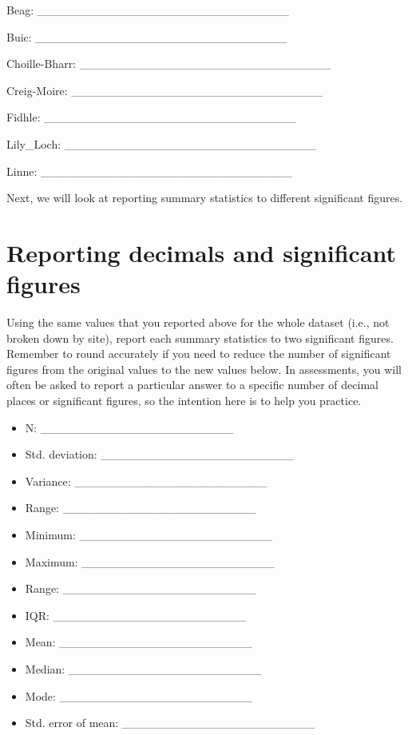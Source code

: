 \documentclass[
]{scrbook}
\providecommand{\tightlist}{%
  \setlength{\itemsep}{0pt}\setlength{\parskip}{0pt}}
\begin{document}
Beag: \_\_\_\_\_\_\_\_\_\_\_\_\_\_\_\_\_\_\_\_\_\_\_\_\_\_\_\_\_\_

Buic: \_\_\_\_\_\_\_\_\_\_\_\_\_\_\_\_\_\_\_\_\_\_\_\_\_\_\_\_\_\_

Choille-Bharr: \_\_\_\_\_\_\_\_\_\_\_\_\_\_\_\_\_\_\_\_\_\_\_\_\_\_\_\_\_\_

Creig-Moire: \_\_\_\_\_\_\_\_\_\_\_\_\_\_\_\_\_\_\_\_\_\_\_\_\_\_\_\_\_\_

Fidhle: \_\_\_\_\_\_\_\_\_\_\_\_\_\_\_\_\_\_\_\_\_\_\_\_\_\_\_\_\_\_

Lily\_Loch: \_\_\_\_\_\_\_\_\_\_\_\_\_\_\_\_\_\_\_\_\_\_\_\_\_\_\_\_\_\_

Linne: \_\_\_\_\_\_\_\_\_\_\_\_\_\_\_\_\_\_\_\_\_\_\_\_\_\_\_\_\_\_

Next, we will look at reporting summary statistics to different significant figures.

\hypertarget{reporting-decimals-and-significant-figures}{%
\section{Reporting decimals and significant figures}\label{reporting-decimals-and-significant-figures}}

Using the same values that you reported above for the whole dataset (i.e., not broken down by site), report each summary statistics to two significant figures.
Remember to round accurately if you need to reduce the number of significant figures from the original values to the new values below.
In assessments, you will often be asked to report a particular answer to a specific number of decimal places or significant figures, so the intention here is to help you practice.

\begin{itemize}
\tightlist
\item
  N: \_\_\_\_\_\_\_\_\_\_\_\_\_\_\_\_\_\_\_\_\_\_\_
\item
  Std. deviation: \_\_\_\_\_\_\_\_\_\_\_\_\_\_\_\_\_\_\_\_\_\_\_
\item
  Variance: \_\_\_\_\_\_\_\_\_\_\_\_\_\_\_\_\_\_\_\_\_\_\_
\item
  Range: \_\_\_\_\_\_\_\_\_\_\_\_\_\_\_\_\_\_\_\_\_\_\_
\item
  Minimum: \_\_\_\_\_\_\_\_\_\_\_\_\_\_\_\_\_\_\_\_\_\_\_
\item
  Maximum: \_\_\_\_\_\_\_\_\_\_\_\_\_\_\_\_\_\_\_\_\_\_\_
\item
  Range: \_\_\_\_\_\_\_\_\_\_\_\_\_\_\_\_\_\_\_\_\_\_\_
\item
  IQR: \_\_\_\_\_\_\_\_\_\_\_\_\_\_\_\_\_\_\_\_\_\_\_
\item
  Mean: \_\_\_\_\_\_\_\_\_\_\_\_\_\_\_\_\_\_\_\_\_\_\_
\item
  Median: \_\_\_\_\_\_\_\_\_\_\_\_\_\_\_\_\_\_\_\_\_\_\_
\item
  Mode: \_\_\_\_\_\_\_\_\_\_\_\_\_\_\_\_\_\_\_\_\_\_\_
\item
  Std. error of mean: \_\_\_\_\_\_\_\_\_\_\_\_\_\_\_\_\_\_\_\_\_\_\_
\end{itemize}
\end{document}
